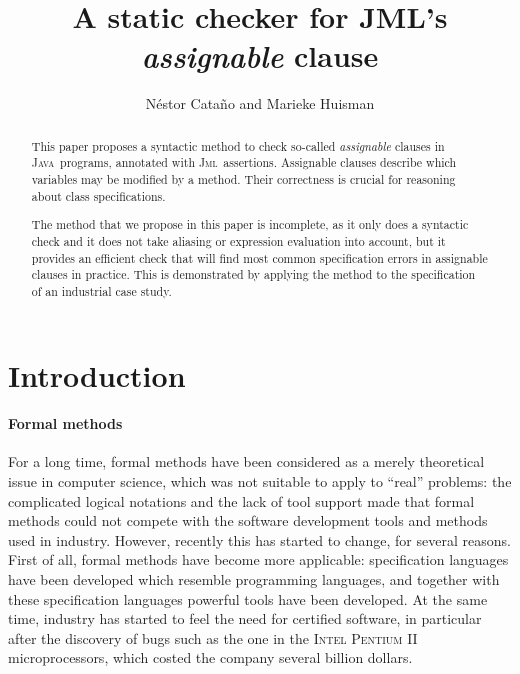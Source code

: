 \documentclass[a4paper]{llncs}
\title{A static checker for JML's \emph{assignable} clause}
\author{
  N\'estor Cata\~no and Marieke Huisman  \\
  \institute{
       \inria\ Sophia-Antipolis, France \\
       \lemme~Project
  } 
  \email{\{Nestor.Catano, Marieke.Huisman\}@sophia.inria.fr}
}
\newcommand{\jml}{\textsc{Jml}}
\newcommand{\java}{\textsc{Java}}
\newcommand{\gplus}{\textsc{GemPlus}}
\begin{document}
\fussy
\maketitle
\pagestyle{plain}

\begin{abstract}
This paper proposes a syntactic method to check so-called
\emph{assignable} clauses in \java\ programs, annotated with \jml\
assertions. Assignable clauses describe which variables may be
modified by a method. Their correctness is crucial for reasoning about 
class specifications. 

The method that we propose in this paper is incomplete, as it only
does a syntactic check and it does not take aliasing or expression evaluation
into account, but it provides an efficient check that will find most
common specification errors in assignable clauses in practice. This is 
demonstrated by applying the method to the specification of an
industrial case study.



\end{abstract}






\section{Introduction}
\label{sec-intro}

\paragraph{\bf Formal methods}
For a long time, formal methods have been considered as a merely
theoretical issue in computer science, which was not suitable to apply
to ``real'' problems: the complicated logical notations and the lack
of tool support made that formal methods could not compete with the
software development tools and methods used in industry. However,
recently this has started to change, for several reasons. First of
all, formal methods have become more applicable: specification
languages have been developed which resemble programming languages,
and together with these specification languages powerful tools have
been developed. At the same time, industry has started to feel the
need for certified software, in particular after the discovery of bugs such as
the one in the \textsc{Intel} \textsc{Pentium II} microprocessors,
which costed the company several billion dollars.
\end{document}
